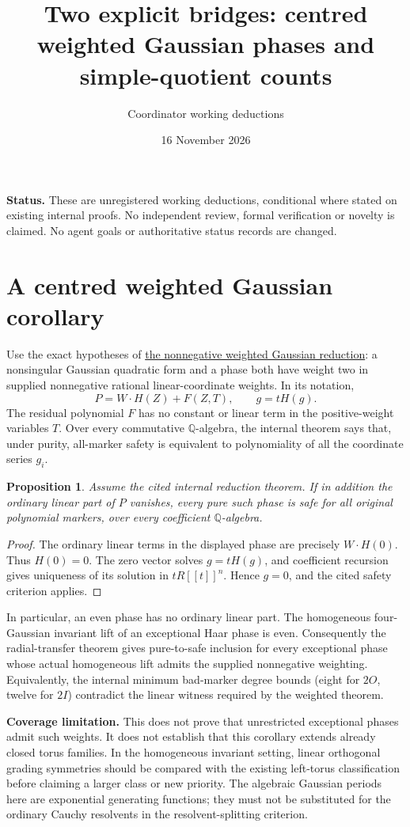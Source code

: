 \documentclass[11pt]{article}
\title{Two explicit bridges: centred weighted Gaussian phases and simple-quotient counts}
\author{Coordinator working deductions}
\date{16 November 2026}
\newtheorem{proposition}{Proposition}
\begin{document}
\maketitle
\noindent\textbf{Status.}
These are unregistered working deductions, conditional where stated on
existing internal proofs. No independent review, formal verification or
novelty is claimed. No agent goals or authoritative status records are changed.

\section{A centred weighted Gaussian corollary}
Use the exact hypotheses of
\href{../moment-vanishing-audit/SEMIPOSITIVE_WEIGHTED_GAUSSIAN_REDUCTION_AND_SAFE_NORMAL_FORMS.md}
{the nonnegative weighted Gaussian reduction}: a nonsingular Gaussian
quadratic form and a phase both have weight two in supplied nonnegative
rational linear-coordinate weights. In its notation,
\[
 P=W\cdot H(Z)+F(Z,T),\qquad g=tH(g).
\]
The residual polynomial $F$ has no constant or linear term in the
positive-weight variables $T$. Over every commutative $\mathbb Q$-algebra,
the internal theorem says that, under purity, all-marker safety is
equivalent to polynomiality of all the coordinate series $g_i$.

\begin{proposition}
Assume the cited internal reduction theorem. If in addition the ordinary
linear part of $P$ vanishes, every pure such phase is safe for all original
polynomial markers, over every coefficient $\mathbb Q$-algebra.
\end{proposition}
\begin{proof}
The ordinary linear terms in the displayed phase are precisely
$W\cdot H(0)$. Thus $H(0)=0$. The zero vector solves $g=tH(g)$, and
coefficient recursion gives uniqueness of its solution in $tR[[t]]^n$.
Hence $g=0$, and the cited safety criterion applies.
\end{proof}

In particular, an even phase has no ordinary linear part. The homogeneous
four-Gaussian invariant lift of an exceptional Haar phase is even.
Consequently the radial-transfer theorem gives pure-to-safe inclusion for
every exceptional phase whose actual homogeneous lift admits the supplied
nonnegative weighting. Equivalently, the internal minimum bad-marker
degree bounds (eight for $2O$, twelve for $2I$) contradict the linear
witness required by the weighted theorem.

\textbf{Coverage limitation.}
This does not prove that unrestricted exceptional phases admit such weights.
It does not establish that this corollary extends already closed torus
families. In the homogeneous invariant setting, linear orthogonal grading
symmetries should be compared with the existing left-torus classification
before claiming a larger class or new priority. The algebraic Gaussian
periods here are exponential generating functions; they must not be
substituted for the ordinary Cauchy resolvents in the resolvent-splitting
criterion.
\end{document}
